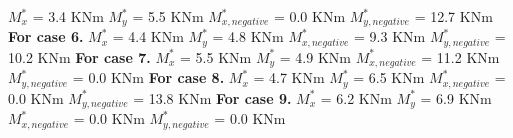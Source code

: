 \documentclass{article}%
\begin{document}
$M_{x}^{*}$ = 3.4 KNm%
\newline%
\newline%
%
$M_{y}^{*}$ = 5.5 KNm%
\newline%
\newline%
%
$M_{x,negative}^{*}$ = 0.0 KNm%
\newline%
\newline%
%
$M_{y,negative}^{*}$ = 12.7 KNm%
\newline%
\newline%
%
\textbf{For case 6.\newline%
\newline%
}%
$M_{x}^{*}$ = 4.4 KNm%
\newline%
\newline%
%
$M_{y}^{*}$ = 4.8 KNm%
\newline%
\newline%
%
$M_{x,negative}^{*}$ = 9.3 KNm%
\newline%
\newline%
%
$M_{y,negative}^{*}$ = 10.2 KNm%
\newline%
\newline%
%
\textbf{For case 7.\newline%
\newline%
}%
$M_{x}^{*}$ = 5.5 KNm%
\newline%
\newline%
%
$M_{y}^{*}$ = 4.9 KNm%
\newline%
\newline%
%
$M_{x,negative}^{*}$ = 11.2 KNm%
\newline%
\newline%
%
$M_{y,negative}^{*}$ = 0.0 KNm%
\newline%
\newline%
%
\textbf{For case 8.\newline%
\newline%
}%
$M_{x}^{*}$ = 4.7 KNm%
\newline%
\newline%
%
$M_{y}^{*}$ = 6.5 KNm%
\newline%
\newline%
%
$M_{x,negative}^{*}$ = 0.0 KNm%
\newline%
\newline%
%
$M_{y,negative}^{*}$ = 13.8 KNm%
\newline%
\newline%
%
\textbf{For case 9.\newline%
\newline%
}%
$M_{x}^{*}$ = 6.2 KNm%
\newline%
\newline%
%
$M_{y}^{*}$ = 6.9 KNm%
\newline%
\newline%
%
$M_{x,negative}^{*}$ = 0.0 KNm%
\newline%
\newline%
%
$M_{y,negative}^{*}$ = 0.0 KNm%
\newline%
\newline%

%
\end{document}
